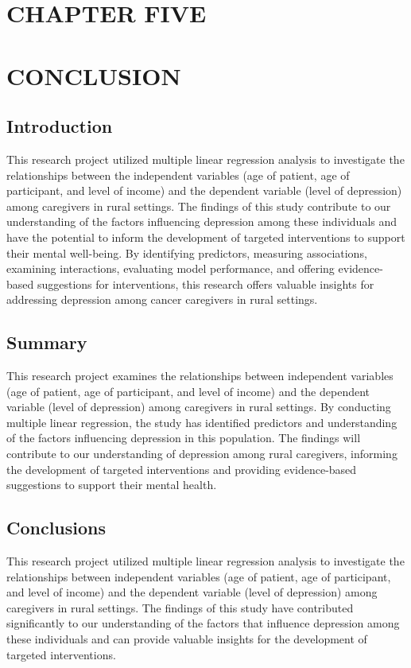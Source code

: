 \documentclass[11pt]{article}\usepackage[]{graphicx}\usepackage[]{xcolor}
\numberwithin{equation}{section}
\numberwithin{table}{section}
\begin{document}
	\section*{CHAPTER FIVE}
\section*{CONCLUSION}
\setcounter{section}{5}
\setcounter{subsection}{0}
\subsection{Introduction}
This research project utilized multiple linear regression analysis to investigate the relationships between the independent variables (age of patient, age of participant, and level of income) and the dependent variable (level of depression) among caregivers in rural settings. The findings of this study contribute to our understanding of the factors influencing depression among these individuals and have the potential to inform the development of targeted interventions to support their mental well-being. By identifying predictors, measuring associations, examining interactions, evaluating model performance, and offering evidence-based suggestions for interventions, this research offers valuable insights for addressing depression among cancer caregivers in rural settings.
\subsection{Summary}
This research project examines the relationships between independent variables (age of patient, age of participant, and level of income) and the dependent variable (level of depression) among caregivers in rural settings. By conducting multiple linear regression, the study has identified predictors and understanding of the factors influencing depression in this population. The findings will contribute to our understanding of depression among rural caregivers, informing the development of targeted interventions and providing evidence-based suggestions to support their mental health.
\subsection{Conclusions}
This research project utilized multiple linear regression analysis to investigate the relationships between independent variables (age of patient, age of participant, and level of income) and the dependent variable (level of depression) among caregivers in rural settings. The findings of this study have contributed significantly to our understanding of the factors that influence depression among these individuals and can provide valuable insights for the development of targeted interventions.\\
\end{document}
